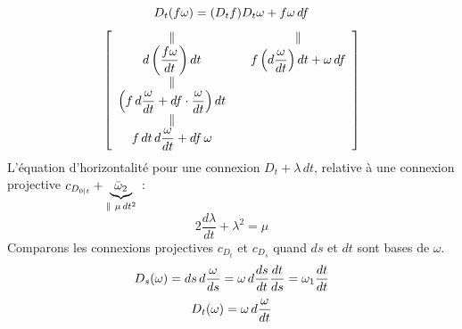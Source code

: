 \[
D_t(f\omega)=({{D_t}}f){D_t}\omega+{f}\omega\,df
\]
\[
\left[\begin{array}{c@{\qquad}c}
\Vert&\Vert\\
d\left(\dfrac{f\omega}{dt}\right)dt&f\left(d\dfrac\omega{dt}\right)dt+\omega\,df\\
\Vert&\\
\left(f\,d\dfrac\omega{dt}+df\cdot\dfrac\omega{dt}\right)dt&\\
\Vert&\\
f\,dt\,d\dfrac\omega{dt}+df\,\omega&
\end{array}\right]
\]
L'équation d'horizontalité pour une  connexion $D_t+\lambda\,dt$\deleted{$\unsure{\omega}$}, relative à une connexion projective  $c_{D_{\unsure{0|t}}}+\underbrace{\bar\omega_2}_{\Vert\ \mu\,dt^2}$ :
\[
\boxed{2\frac{d\lambda}{dt}+\lambda^2=\mu}
\]
Comparons les connexions projectives $c_{D_t}$ et $c_{D_s}$ quand $ds$ et $dt$ sont bases de $\omega$.
\[
{D_s(\omega)=ds\,d\frac\omega{ds}={\omega\,d\frac{ds}{dt}\frac{dt}{ds}=\omega_1\frac{dt}{dt}}}
\]
\[
{D_t(\omega)=\omega\,d\frac\omega{dt}}
\]
